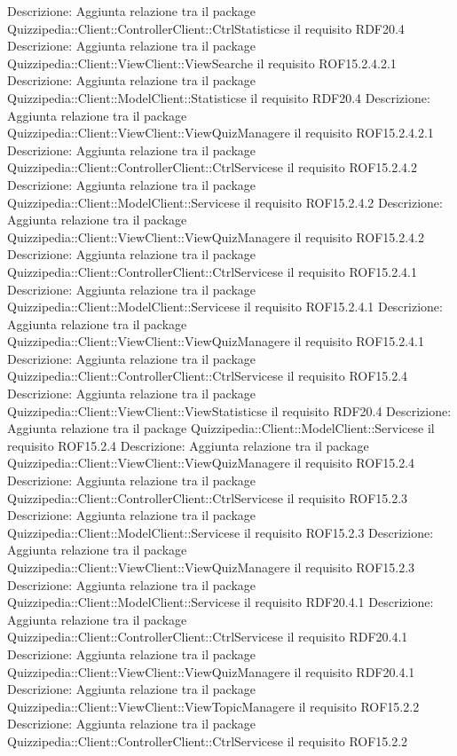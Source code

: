 Descrizione: Aggiunta relazione tra il package Quizzipedia::Client::ControllerClient::CtrlStatisticse il requisito RDF20.4 
Descrizione: Aggiunta relazione tra il package Quizzipedia::Client::ViewClient::ViewSearche il requisito ROF15.2.4.2.1 
Descrizione: Aggiunta relazione tra il package Quizzipedia::Client::ModelClient::Statisticse il requisito RDF20.4 
Descrizione: Aggiunta relazione tra il package Quizzipedia::Client::ViewClient::ViewQuizManagere il requisito ROF15.2.4.2.1 
Descrizione: Aggiunta relazione tra il package Quizzipedia::Client::ControllerClient::CtrlServicese il requisito ROF15.2.4.2 
Descrizione: Aggiunta relazione tra il package Quizzipedia::Client::ModelClient::Servicese il requisito ROF15.2.4.2 
Descrizione: Aggiunta relazione tra il package Quizzipedia::Client::ViewClient::ViewQuizManagere il requisito ROF15.2.4.2 
Descrizione: Aggiunta relazione tra il package Quizzipedia::Client::ControllerClient::CtrlServicese il requisito ROF15.2.4.1 
Descrizione: Aggiunta relazione tra il package Quizzipedia::Client::ModelClient::Servicese il requisito ROF15.2.4.1 
Descrizione: Aggiunta relazione tra il package Quizzipedia::Client::ViewClient::ViewQuizManagere il requisito ROF15.2.4.1 
Descrizione: Aggiunta relazione tra il package Quizzipedia::Client::ControllerClient::CtrlServicese il requisito ROF15.2.4 
Descrizione: Aggiunta relazione tra il package Quizzipedia::Client::ViewClient::ViewStatisticse il requisito RDF20.4 
Descrizione: Aggiunta relazione tra il package Quizzipedia::Client::ModelClient::Servicese il requisito ROF15.2.4 
Descrizione: Aggiunta relazione tra il package Quizzipedia::Client::ViewClient::ViewQuizManagere il requisito ROF15.2.4 
Descrizione: Aggiunta relazione tra il package Quizzipedia::Client::ControllerClient::CtrlServicese il requisito ROF15.2.3 
Descrizione: Aggiunta relazione tra il package Quizzipedia::Client::ModelClient::Servicese il requisito ROF15.2.3 
Descrizione: Aggiunta relazione tra il package Quizzipedia::Client::ViewClient::ViewQuizManagere il requisito ROF15.2.3 
Descrizione: Aggiunta relazione tra il package Quizzipedia::Client::ModelClient::Servicese il requisito RDF20.4.1 
Descrizione: Aggiunta relazione tra il package Quizzipedia::Client::ControllerClient::CtrlServicese il requisito RDF20.4.1 
Descrizione: Aggiunta relazione tra il package Quizzipedia::Client::ViewClient::ViewQuizManagere il requisito RDF20.4.1 
Descrizione: Aggiunta relazione tra il package Quizzipedia::Client::ViewClient::ViewTopicManagere il requisito ROF15.2.2 
Descrizione: Aggiunta relazione tra il package Quizzipedia::Client::ControllerClient::CtrlServicese il requisito ROF15.2.2 
